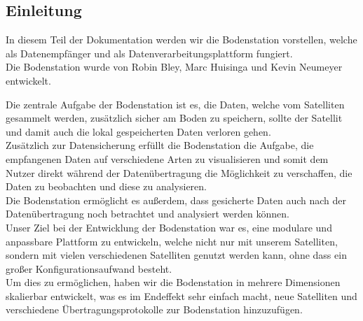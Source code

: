 \subsection{Einleitung}
In diesem Teil der Dokumentation werden wir die Bodenstation vorstellen, welche als Datenempfänger und als Datenverarbeitungsplattform fungiert. \\
Die Bodenstation wurde von Robin Bley, Marc Huisinga und Kevin Neumeyer entwickelt.

Die zentrale Aufgabe der Bodenstation ist es, die Daten, welche vom Satelliten gesammelt werden, zusätzlich sicher am Boden zu speichern, sollte der Satellit und damit auch die lokal gespeicherten Daten verloren gehen. \\
Zusätzlich zur Datensicherung erfüllt die Bodenstation die Aufgabe, die empfangenen Daten auf verschiedene Arten zu visualisieren und somit dem Nutzer direkt während der Datenübertragung die Möglichkeit zu verschaffen, die Daten zu beobachten und diese zu analysieren. \\
Die Bodenstation ermöglicht es außerdem, dass gesicherte Daten auch nach der Datenübertragung noch betrachtet und analysiert werden können. \\
Unser Ziel bei der Entwicklung der Bodenstation war es, eine modulare und anpassbare Plattform zu entwickeln, welche nicht nur mit unserem Satelliten, sondern mit vielen verschiedenen Satelliten genutzt werden kann, ohne dass ein großer Konfigurationsaufwand besteht. \\
Um dies zu ermöglichen, haben wir die Bodenstation in mehrere Dimensionen skalierbar entwickelt, was es im Endeffekt sehr einfach macht, neue Satelliten und verschiedene Übertragungsprotokolle zur Bodenstation hinzuzufügen.